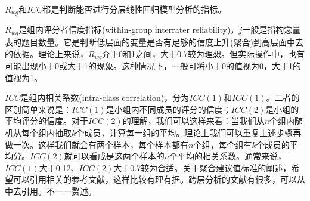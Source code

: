 \documentclass[
]{book}
\begin{document}
\(R_{wg}\)和\(ICC\)都是判断能否进行分层线性回归模型分析的指标。

\(R_{wg}\)是组内评分者信度指标(within-group interrater reliability)，\(j\)一般是指构念量表的题目数量。它是判断低层面的变量是否有足够的信度上升(聚合)到高层面中去的依据。理论上来说，\(R_{wg}\)介于0和1之间，大于0.7较为理想。但实际操作中，也有可能出现小于0或大于1的现象。这种情况下，一般可将小于0的值视为0，大于1的值视为1\autocite{law2014:StochProc}。

\(ICC\)是组内相关系数(intra-class correlation)，分为\(ICC(1)\)和\(ICC(1)\)。二者的区别简单来说是：\(ICC(1)\)是小组内不同成员的评分的信度；\(ICC(2)\)是小组的平均评分的信度。对于\(ICC(2)\)的理解，我们可以这样来看：当我们从\(n\)个组内随机从每个组内抽取\(k\)个成员，计算每一组的平均。理论上我们可以重复上述步骤再做一次。这样我们就会有两个样本，每个样本都有\(n\)个组，每个组有\(k\)个成员的平均分。\(ICC(2)\)就可以看成是这两个样本的\(n\)个平均的相关系数。通常来说，\(ICC(1)\)大于0.12、\(ICC(2)\)大于0.7较为合适。关于聚合建议值标准的阐述，希望可以引用相关的参考文献，这样比较有理有据。跨层分析的文献有很多，可以从中去引用。不一一赘述。

\printbibliography
\end{document}
